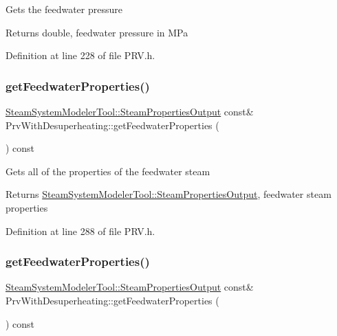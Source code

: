 Gets the feedwater pressure

\begin{DoxyReturn}{Returns}
double, feedwater pressure in M\+Pa 
\end{DoxyReturn}


Definition at line 228 of file P\+R\+V.\+h.

\mbox{\label{class_prv_with_desuperheating_a8f4594109bda9bc4030c23cee9841fa8}} 
\subsubsection{\texorpdfstring{get\+Feedwater\+Properties()}{getFeedwaterProperties()}\hspace{0.1cm}{\footnotesize\ttfamily [1/3]}}
{\footnotesize\ttfamily \hyperlink{struct_steam_system_modeler_tool_1_1_steam_properties_output}{Steam\+System\+Modeler\+Tool\+::\+Steam\+Properties\+Output} const\& Prv\+With\+Desuperheating\+::get\+Feedwater\+Properties (\begin{DoxyParamCaption}{ }\end{DoxyParamCaption}) const\hspace{0.3cm}{\ttfamily [inline]}}

Gets all of the properties of the feedwater steam \begin{DoxyReturn}{Returns}
\hyperlink{struct_steam_system_modeler_tool_1_1_steam_properties_output}{Steam\+System\+Modeler\+Tool\+::\+Steam\+Properties\+Output}, feedwater steam properties 
\end{DoxyReturn}


Definition at line 288 of file P\+R\+V.\+h.

\mbox{\label{class_prv_with_desuperheating_a8f4594109bda9bc4030c23cee9841fa8}} 
\subsubsection{\texorpdfstring{get\+Feedwater\+Properties()}{getFeedwaterProperties()}\hspace{0.1cm}{\footnotesize\ttfamily [2/3]}}
{\footnotesize\ttfamily \hyperlink{struct_steam_system_modeler_tool_1_1_steam_properties_output}{Steam\+System\+Modeler\+Tool\+::\+Steam\+Properties\+Output} const\& Prv\+With\+Desuperheating\+::get\+Feedwater\+Properties (\begin{DoxyParamCaption}{ }\end{DoxyParamCaption}) const\hspace{0.3cm}{\ttfamily [inline]}}

